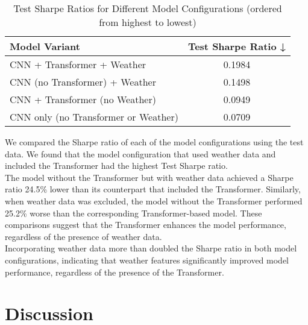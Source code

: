 \documentclass[12pt]{article}
\begin{document}
\begin{table}[H]
\centering
\begin{tabular}{|l|c|}
\hline
\textbf{Model Variant} & \textbf{Test Sharpe Ratio ↓} \\
\hline
CNN + Transformer + Weather          & 0.1984 \\
CNN (no Transformer) + Weather       & 0.1498 \\
CNN + Transformer (no Weather)       & 0.0949 \\
CNN only (no Transformer or Weather) & 0.0709 \\
\hline
\end{tabular}
\caption{Test Sharpe Ratios for Different Model Configurations (ordered from highest to lowest)}
\label{tab:sharpe_comparison}
\end{table}

\noindent
We compared the Sharpe ratio of each of the model configurations using the test data. We found that the model configuration that used weather data and included the Transformer had the highest Test Sharpe ratio. 
\\
\noindent
The model without the Transformer but with weather data achieved a Sharpe ratio 24.5\% lower than its counterpart that included the Transformer. Similarly, when weather data was excluded, the model without the Transformer performed 25.2\% worse than the corresponding Transformer-based model. These comparisons suggest that the Transformer enhances the model performance, regardless of the presence of weather data.
\\
\noindent
Incorporating weather data more than doubled the Sharpe ratio in both model configurations, indicating that weather features significantly improved model performance, regardless of the presence of the Transformer.


\clearpage




\section{Discussion}
\end{document}
